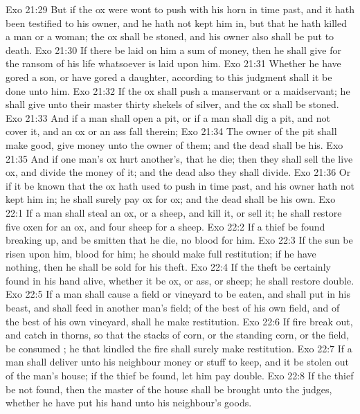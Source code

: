 \vs Exo 21:29 But if the ox were wont to push with his horn in time past, and it hath been testified to his owner, and he hath not kept him in, but that he hath killed a man or a woman; the ox shall be stoned, and his owner also shall be put to death.
\vs Exo 21:30 If there be laid on him a sum of money, then he shall give for the ransom of his life whatsoever is laid upon him.
\vs Exo 21:31 Whether he have gored a son, or have gored a daughter, according to this judgment shall it be done unto him.
\vs Exo 21:32 If the ox shall push a manservant or a maidservant; he shall give unto their master thirty shekels of silver, and the ox shall be stoned.
\vs Exo 21:33 And if a man shall open a pit, or if a man shall dig a pit, and not cover it, and an ox or an ass fall therein;
\vs Exo 21:34 The owner of the pit shall make  good,  give money unto the owner of them; and the dead  shall be his.
\vs Exo 21:35 And if one man's ox hurt another's, that he die; then they shall sell the live ox, and divide the money of it; and the dead  also they shall divide.
\vs Exo 21:36 Or if it be known that the ox hath used to push in time past, and his owner hath not kept him in; he shall surely pay ox for ox; and the dead shall be his own.
\vs Exo 22:1 If a man shall steal an ox, or a sheep, and kill it, or sell it; he shall restore five oxen for an ox, and four sheep for a sheep.
\vs Exo 22:2 If a thief be found breaking up, and be smitten that he die,  no blood  for him.
\vs Exo 22:3 If the sun be risen upon him,  blood  for him;  he should make full restitution; if he have nothing, then he shall be sold for his theft.
\vs Exo 22:4 If the theft be certainly found in his hand alive, whether it be ox, or ass, or sheep; he shall restore double.
\vs Exo 22:5 If a man shall cause a field or vineyard to be eaten, and shall put in his beast, and shall feed in another man's field; of the best of his own field, and of the best of his own vineyard, shall he make restitution.
\vs Exo 22:6 If fire break out, and catch in thorns, so that the stacks of corn, or the standing corn, or the field, be consumed ; he that kindled the fire shall surely make restitution.
\vs Exo 22:7 If a man shall deliver unto his neighbour money or stuff to keep, and it be stolen out of the man's house; if the thief be found, let him pay double.
\vs Exo 22:8 If the thief be not found, then the master of the house shall be brought unto the judges,  whether he have put his hand unto his neighbour's goods.
